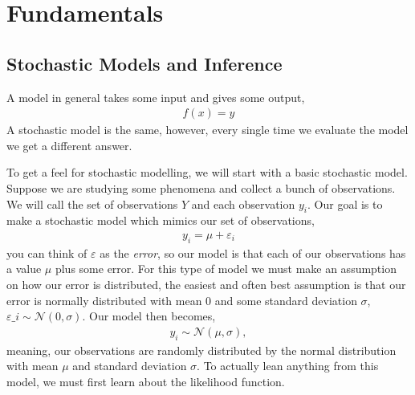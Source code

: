 \chapter{Fundamentals}

\section{Stochastic Models and Inference}

A model in general takes some input and gives some output,
\begin{align*}
    f(x) = y
\end{align*}
A stochastic model is the same, however, every single time we evaluate the model we get a different answer. 

To get a feel for stochastic modelling, we will start with a basic stochastic model. Suppose we are studying some phenomena and collect a bunch of observations. We will call the set of observations $Y$ and each observation $y_i$. Our goal is to make a stochastic model which mimics our set of observations,
\begin{align*}
    y_i = \mu + \varepsilon_i
\end{align*}
you can think of $\varepsilon$ as the \textit{error}, so our model is that each of our observations has a value $\mu$ plus some error. For this type of model we must make an assumption on how our error is distributed, the easiest and often best assumption is that our error is normally distributed with mean 0 and some standard deviation $\sigma$, $\varepsilon\_i\sim\mathcal{N}(0,\sigma)$. Our model then becomes,
\begin{align*}
    y_i\sim\mathcal{N}(\mu,\sigma),
\end{align*}
meaning, our observations are randomly distributed by the normal distribution with mean $\mu$ and standard deviation $\sigma$. To actually lean anything from this model, we must first learn about the likelihood function.

